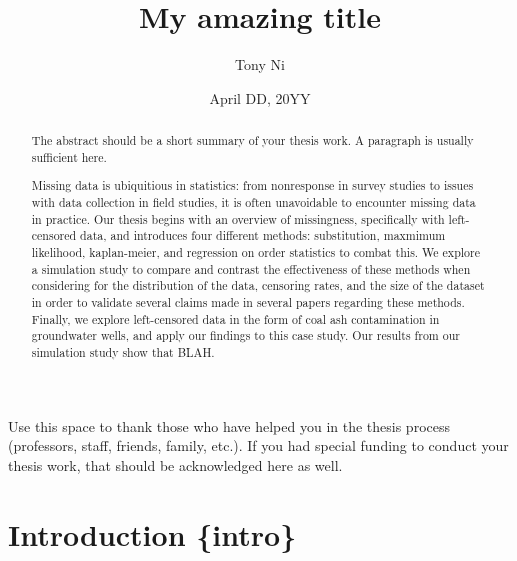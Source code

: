 \documentclass[12pt, twoside]{amherstthesis}
\title{My amazing title}
\author{Tony Ni}
\date{April DD, 20YY}
\begin{document}
\doublespace
  \maketitle

\frontmatter %
\pagestyle{fancyplain}

  \begin{abstract}
    The abstract should be a short summary of your thesis work. A paragraph is usually sufficient here.

    Missing data is ubiquitious in statistics: from nonresponse in survey studies to issues with data collection in field studies, it is
    often unavoidable to encounter missing data in practice. Our thesis begins with an overview of missingness, specifically with
    left-censored data, and introduces four different methods: substitution, maxmimum likelihood, kaplan-meier, and regression on order
    statistics to combat this. We explore a simulation study to compare and contrast the effectiveness of these methods when considering
    for the distribution of the data, censoring rates, and the size of the dataset in order to validate several claims made in several
    papers regarding these methods. Finally, we explore left-censored data in the form of coal ash contamination in groundwater wells,
    and apply our findings to this case study. Our results from our simulation study show that BLAH.
  \end{abstract}
  \begin{acknowledgments}
    Use this space to thank those who have helped you in the thesis process (professors, staff, friends, family, etc.). If you had special funding to conduct your thesis work, that should be acknowledged here as well.
  \end{acknowledgments}

  \hypersetup{linkcolor=black}
  \setcounter{tocdepth}{2}
  \tableofcontents

  \listoftables

  \listoffigures


\mainmatter %
\pagestyle{fancyplain} %

\hypertarget{introduction-intro}{%
\chapter{Introduction \{intro\}}\label{introduction-intro}}
\end{document}
